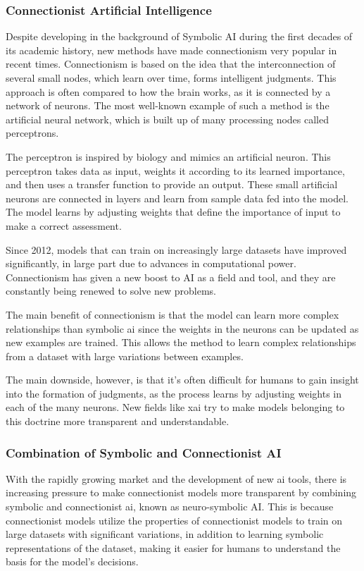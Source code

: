 \subsubsection{Connectionist Artificial Intelligence}
Despite developing in the background of Symbolic AI during the first decades of its academic history, new methods have made connectionism very popular in recent times. Connectionism is based on the idea that the interconnection of several small nodes, which learn over time, forms intelligent judgments. This approach is often compared to how the brain works, as it is connected by a network of neurons. The most well-known example of such a method is the artificial neural network, which is built up of many processing nodes called perceptrons.

The perceptron is inspired by biology and mimics an artificial neuron. This perceptron takes data as input, weights it according to its learned importance, and then uses a transfer function to provide an output. These small artificial neurons are connected in layers and learn from sample data fed into the model. The model learns by adjusting weights that define the importance of input to make a correct assessment.

Since 2012, models that can train on increasingly large datasets have improved significantly, in large part due to advances in computational power. Connectionism has given a new boost to AI as a field and tool, and they are constantly being renewed to solve new problems.

The main benefit of connectionism is that the model can learn more complex relationships than symbolic \gls{ai} since the weights in the neurons can be updated as new examples are trained. This allows the method to learn complex relationships from a dataset with large variations between examples.

The main downside, however, is that it's often difficult for humans to gain insight into the formation of judgments, as the process learns by adjusting weights in each of the many neurons. New fields like \gls{xai} try to make models belonging to this doctrine more transparent and understandable.


\subsubsection{Combination of Symbolic and Connectionist AI}
With the rapidly growing market and the development of new \gls{ai} tools, there is increasing pressure to make connectionist models more transparent by combining symbolic and connectionist \gls{ai}, known as neuro-symbolic AI. This is because connectionist models utilize the properties of connectionist models to train on large datasets with significant variations, in addition to learning symbolic representations of the dataset, making it easier for humans to understand the basis for the model's decisions.

